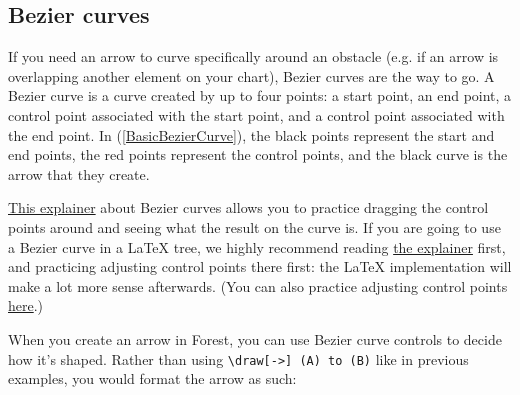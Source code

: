 \documentclass{article}
\begin{document}
\subsection{Bezier curves}

If you need an arrow to curve specifically around an obstacle (e.g. if an arrow is overlapping another element on your chart), Bezier curves are the way to go. A Bezier curve is a curve created by up to four points: a start point, an end point, a control point associated with the start point, and a control point associated with the end point. In (\ref{BasicBezierCurve}), the black points represent the start and end points, the red points represent the control points, and the black curve is the arrow that they create. 

\ea \label{BasicBezierCurve}
\z

\noindent \href{https://javascript.info/bezier-curve}{This explainer} about Bezier curves allows you to practice dragging the control points around and seeing what the result on the curve is. If you are going to use a Bezier curve in a LaTeX tree, we highly recommend reading \href{https://javascript.info/bezier-curve}{the explainer} first, and practicing adjusting control points there first: the LaTeX implementation will make a lot more sense afterwards. (You can also practice adjusting control points \href{https://cubic-bezier.com/#0,0,.58,1}{here}.)

When you create an arrow in Forest, you can use Bezier curve controls to decide how it's shaped. Rather than using \verb|\draw[->] (A) to (B)| like in previous examples, you would format the arrow as such: 
\end{document}
